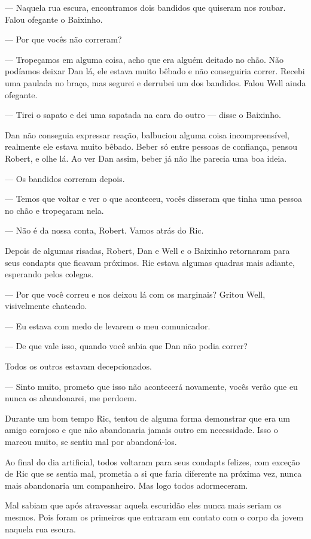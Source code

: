 \documentclass[a4paper,14pt]{book}
\begin{document}
— Naquela rua escura, encontramos dois bandidos que quiseram nos roubar. Falou ofegante o Baixinho.

— Por que vocês não correram?

— Tropeçamos em alguma coisa, acho que era alguém deitado no chão. Não podíamos deixar Dan lá, ele estava muito bêbado e não conseguiria correr. Recebi uma paulada no braço, mas segurei e derrubei um dos bandidos. Falou Well ainda ofegante.

— Tirei o sapato e dei uma sapatada na cara do outro — disse o Baixinho.

Dan não conseguia expressar reação, balbuciou alguma coisa incompreensível, realmente ele estava muito bêbado. Beber só entre pessoas de confiança, pensou Robert, e olhe lá. Ao ver Dan assim, beber já não lhe parecia uma boa ideia.

— Os bandidos correram depois.

— Temos que voltar e ver o que aconteceu, vocês disseram que tinha uma pessoa no chão e tropeçaram nela.

— Não é da nossa conta, Robert. Vamos atrás do Ric.

Depois de algumas risadas, Robert, Dan e Well e o Baixinho retornaram para seus condapts que ficavam próximos. Ric estava algumas quadras mais adiante, esperando pelos colegas.

— Por que você correu e nos deixou lá com os marginais? Gritou Well, visivelmente chateado.

— Eu estava com medo de levarem o meu comunicador.

— De que vale isso, quando você sabia que Dan não podia correr?

Todos os outros estavam decepcionados.

— Sinto muito, prometo que isso não acontecerá novamente, vocês verão que eu nunca os abandonarei, me perdoem.

Durante um bom tempo Ric, tentou de alguma forma demonstrar que era um amigo corajoso e que não abandonaria jamais outro em necessidade. Isso o marcou muito, se sentiu mal por abandoná-los.

Ao final do dia artificial, todos voltaram para seus condapts felizes, com exceção de Ric que se sentia mal, prometia a si que faria diferente na próxima vez, nunca mais abandonaria um companheiro. Mas logo todos adormeceram.

Mal sabiam que após atravessar aquela escuridão eles nunca mais seriam os mesmos. Pois foram os primeiros que entraram em contato com o corpo da jovem naquela rua escura.
\end{document}
